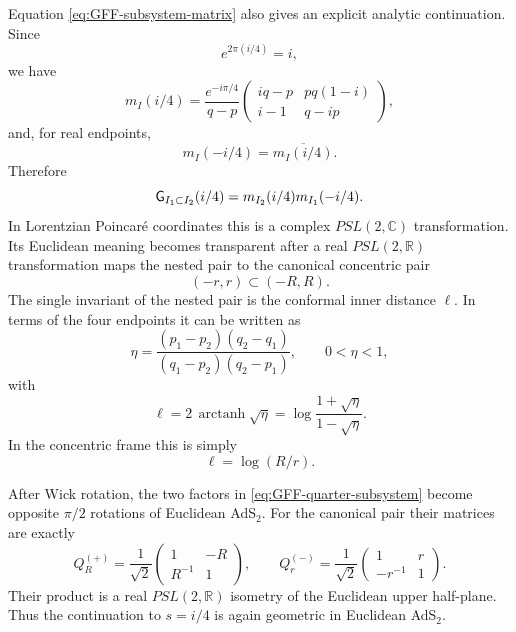 \documentclass[a4paper,11pt]{article}
\theoremstyle{definition}
\begin{document}
Equation \eqref{eq:GFF-subsystem-matrix} also gives an explicit analytic
continuation. Since
\begin{equation}
    e^{2\pi(i/4)}=i,
\end{equation}
we have
\begin{equation}
    m_I(i/4)
    =
    \frac{e^{-i\pi/4}}{q-p}
    \begin{pmatrix}
        iq-p
        &
        pq(1-i)
        \\[2mm]
        i-1
        &
        q-ip
    \end{pmatrix},
    \label{eq:GFF-quarter-matrix}
\end{equation}
and, for real endpoints,
\begin{equation}
    m_I(-i/4)=\overline{m_I(i/4)}.
\end{equation}
Therefore
\begin{equation}
    {\sf G}_{I_1\subset I_2}(i/4)
    =
    m_{I_2}(i/4)m_{I_1}(-i/4).
    \label{eq:GFF-quarter-subsystem}
\end{equation}
In Lorentzian Poincar\'e coordinates this is a complex
$PSL(2,\mathbb C)$ transformation. Its Euclidean meaning becomes
transparent after a real $PSL(2,\mathbb R)$ transformation maps the
nested pair to the canonical concentric pair
\begin{equation}
    (-r,r)\subset(-R,R).
\end{equation}
The single invariant of the nested pair is the conformal inner distance
$\ell$. In terms of the four endpoints it can be written as
\begin{equation}
    \eta
    =
    \frac{
        (p_1-p_2)(q_2-q_1)
    }{
        (q_1-p_2)(q_2-p_1)
    },
    \qquad
    0<\eta<1,
    \label{eq:GFF-crossratio}
\end{equation}
with
\begin{equation}
    \ell
    =
    2\,\operatorname{arctanh}\sqrt{\eta}
    =
    \log
    \frac{1+\sqrt{\eta}}{1-\sqrt{\eta}}.
    \label{eq:GFF-inner-distance}
\end{equation}
In the concentric frame this is simply
\begin{equation}
    \ell=\log(R/r).
\end{equation}

After Wick rotation, the two factors in
\eqref{eq:GFF-quarter-subsystem} become opposite $\pi/2$ rotations of
Euclidean AdS$_2$. For the canonical pair their matrices are exactly
\begin{equation}
    Q_R^{(+)}
    =
    \frac1{\sqrt2}
    \begin{pmatrix}
        1&-R\\
        R^{-1}&1
    \end{pmatrix},
    \qquad
    Q_r^{(-)}
    =
    \frac1{\sqrt2}
    \begin{pmatrix}
        1&r\\
        -r^{-1}&1
    \end{pmatrix}.
\end{equation}
Their product is a real $PSL(2,\mathbb R)$ isometry of the Euclidean
upper half-plane. Thus the continuation to $s=i/4$ is again geometric
in Euclidean AdS$_2$.
\end{document}
